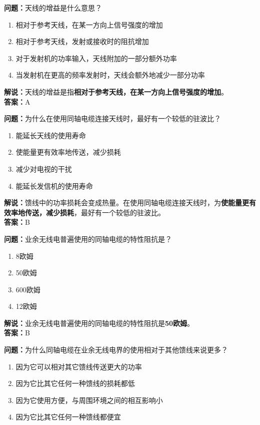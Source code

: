 \textbf{问题：}天线的增益是什么意思？

\begin{enumerate}[label=\Alph*), leftmargin=1.5cm]
	\item 相对于参考天线，在某一方向上信号强度的增加
	\item 相对于参考天线，发射或接收时的阻抗增加
	\item 对于发射机的功率输入，天线附加的一部分额外功率
	\item 当发射机在更高的频率发射时，天线会额外地减少一部分功率
\end{enumerate}

\textbf{解说：}天线的增益是指\textbf{相对于参考天线，在某一方向上信号强度的增加}。\\\textbf{答案：}A



\textbf{问题：}为什么在使用同轴电缆连接天线时，最好有一个较低的驻波比？

\begin{enumerate}[label=\Alph*), leftmargin=1.5cm]
	\item 能延长天线的使用寿命
	\item 使能量更有效率地传送，减少损耗
	\item 减少对电视的干扰
	\item 能延长发信机的使用寿命
\end{enumerate}

\textbf{解说：}馈线中的功率损耗会变成热量。在使用同轴电缆连接天线时，为\textbf{使能量更有效率地传送，减少损耗}，最好有一个较低的驻波比。\\\textbf{答案：}B



\textbf{问题：}业余无线电普遍使用的同轴电缆的特性阻抗是？

\begin{enumerate}[label=\Alph*), leftmargin=1.5cm]
	\item 8欧姆
	\item 50欧姆
	\item 600欧姆
	\item 12欧姆
\end{enumerate}

\textbf{解说：}业余无线电普遍使用的同轴电缆的特性阻抗是\textbf{50欧姆}。\\\textbf{答案：}B



\textbf{问题：}为什么同轴电缆在业余无线电界的使用相对于其他馈线来说更多？

\begin{enumerate}[label=\Alph*), leftmargin=1.5cm]
	\item 因为它可以相对其它馈线传送更大的功率
	\item 因为它比其它任何一种馈线的损耗都低
	\item 因为它使用方便，与周围环境之间的相互影响小
	\item 因为它比其它任何一种馈线都便宜
\end{enumerate}

